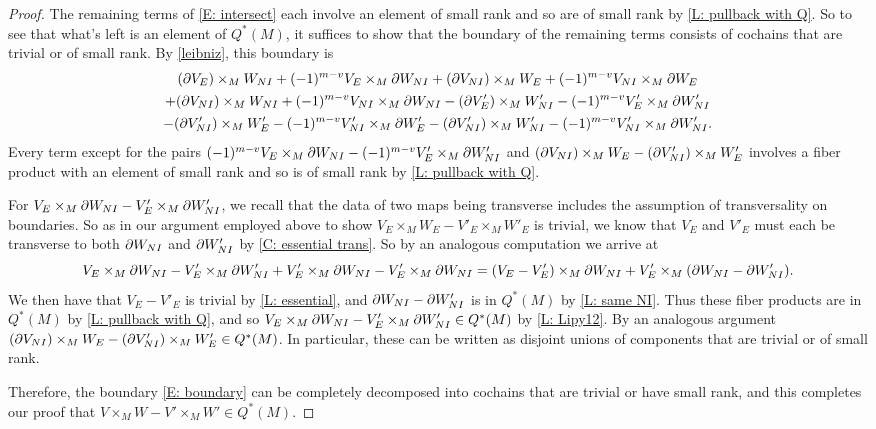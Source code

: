 \begin{proof}
	The remaining terms of \eqref{E: intersect} each involve an element of small rank and so are of small rank by \cref{L: pullback with Q}.
	So to see that what's left is an element of $Q^*(M)$, it suffices to show that the boundary of the remaining terms consists of cochains that are trivial or of small rank.
	By \cref{leibniz}, this boundary is
	\begin{multline}\label{E: boundary}
		(\partial V_E) \times_M W_{NI}+(-1)^{m-v}V_E \times_M \partial W_{NI}+
		(\partial V_{NI}) \times_M W_E+(-1)^{m-v}V_{NI} \times_M \partial W_E\\
		+(\partial V_{NI}) \times_M W_{NI}+(-1)^{m-v}V_{NI} \times_M \partial W_{NI}
		-(\partial V'_E) \times_M W'_{NI}-(-1)^{m-v}V'_E \times_M \partial W'_{NI}\\
		-(\partial V'_{NI}) \times_M W'_E-(-1)^{m-v}V'_{NI} \times_M \partial W'_E- (\partial V'_{NI}) \times_M W'_{NI}-(-1)^{m-v}V'_{NI} \times_M \partial W'_{NI}.
	\end{multline}
	Every term except for the pairs $(-1)^{m-v}V_E \times_M \partial W_{NI}-(-1)^{m-v}V'_E \times_M \partial W'_{NI}$ and $(\partial V_{NI}) \times_M W_E-(\partial V'_{NI}) \times_M W'_E$ involves a fiber product with an element of small rank and so is of small rank by \cref{L: pullback with Q}.

	For $V_E \times_M \partial W_{NI}-V'_E \times_M \partial W'_{NI}$, we recall that the data of two maps being transverse includes the assumption of transversality on boundaries.
	So as in our argument employed above to show $V_E \times_M W_E -V'_E \times_M W'_E$ is trivial, we know that $V_E$ and $V'_E$ must each be transverse to both $\partial W_{NI}$ and $\partial W'_{NI}$ by \cref{C: essential trans}.
	So by an analogous computation we arrive at
	\begin{equation*}
		V_E \times_M \partial W_{NI}-V'_E \times_M \partial W'_{NI} + V'_E \times_M \partial W_{NI} - V'_E \times_M \partial W_{NI} = (V_E- V'_E) \times_M \partial W_{NI}+ V'_E \times_M (\partial W_{NI}-\partial W'_{NI}).
	\end{equation*}
	We then have that $V_E - V'_E$ is trivial by \cref{L: essential}, and $\partial W_{NI}-\partial W'_{NI}$ is in $Q^*(M)$ by \cref{L: same NI}.
	Thus these fiber products are in $Q^*(M)$ by \cref{L: pullback with Q}, and so $V_E \times_M \partial W_{NI}-V'_E \times_M \partial W'_{NI} \in Q^*(M)$ by \cref{L: Lipy12}.
	By an analogous argument $(\partial V_{NI}) \times_M W_E-(\partial V'_{NI}) \times_M W'_E \in Q^*(M)$.
	In particular, these can be written as disjoint unions of components that are trivial or of small rank.

	Therefore, the boundary \eqref{E: boundary} can be completely decomposed into cochains that are trivial or have small rank,
	and this completes our proof that $V \times_M W-V' \times_M W' \in Q^*(M)$.
\end{proof}

